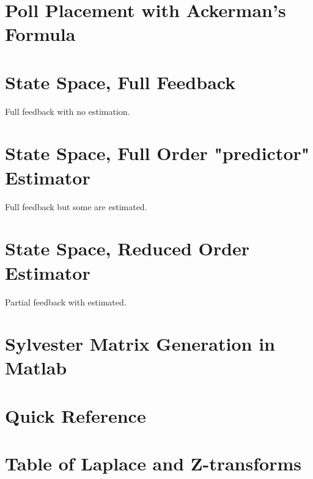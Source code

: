 \documentclass{article}
\begin{document}
\section{Poll Placement with Ackerman's Formula}

\section{State Space, Full Feedback}

Full feedback with no estimation.

\section{State Space, Full Order "predictor" Estimator}

Full feedback but some are estimated.

\section{State Space, Reduced Order Estimator}

Partial feedback with estimated.

\clearpage
\printbibliography[heading=bibintoc]

\clearpage
\appendix

\section{Sylvester Matrix Generation in Matlab}
\label{app:sylvester}




\section{Quick Reference}

\section{Table of Laplace and Z-transforms}
\end{document}
